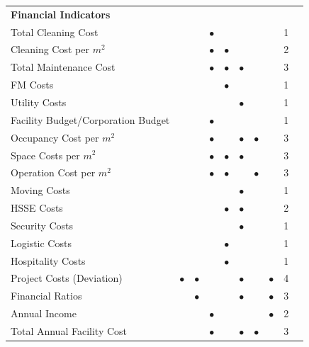 \begin{table}
\begin{adjustwidth}{2cm}{0cm}
{\begin{tabular}{p{6cm}llllllp{1cm}lr}
		\hline
		{\bf Financial Indicators} 	& & & & & & & & \\
		Total Cleaning Cost 				& & &$\bullet$ & & & & & 1 \\
		Cleaning Cost per $m^2$ 			& & &$\bullet$ &$\bullet$ & & & & 2 \\
		Total Maintenance Cost 				& & &$\bullet$ &$\bullet$ &$\bullet$ & & & 3 \\
		FM Costs 							& & & &$\bullet$ & & & & 1 \\
		Utility Costs 						& & & & &$\bullet$ & & & 1 \\
		Facility Budget/Corporation Budget 	& & &$\bullet$ & & & & & 1 \\
		Occupancy Cost per $m^2$ 			& & &$\bullet$ & &$\bullet$ &$\bullet$ & & 3 \\
		Space Costs per $m^2$ 				& & &$\bullet$ &$\bullet$ &$\bullet$ & & & 3 \\
		Operation Cost per $m^2$ 			& & &$\bullet$ &$\bullet$ & &$\bullet$ & & 3 \\
		Moving Costs 						& & & & &$\bullet$ & & & 1 \\
		HSSE Costs 							& & & &$\bullet$ &$\bullet$ & & & 2 \\
		Security Costs 						& & & & &$\bullet$ & & & 1 \\
		Logistic Costs 						& & & &$\bullet$ & & & & 1 \\
		Hospitality Costs 					& & & &$\bullet$ & & & & 1 \\
		Project Costs (Deviation) 			&$\bullet$ &$\bullet$ & & &$\bullet$ & &$\bullet$ & 4 \\
		Financial Ratios 					& &$\bullet$ & & &$\bullet$ & &$\bullet$ & 3 \\
		Annual Income 						& & &$\bullet$ & & & &$\bullet$ & 2 \\
		Total Annual Facility Cost 			& & &$\bullet$ & &$\bullet$ &$\bullet$ & & 3 \\

\end{tabular}}
\end{adjustwidth}
\end{table}
